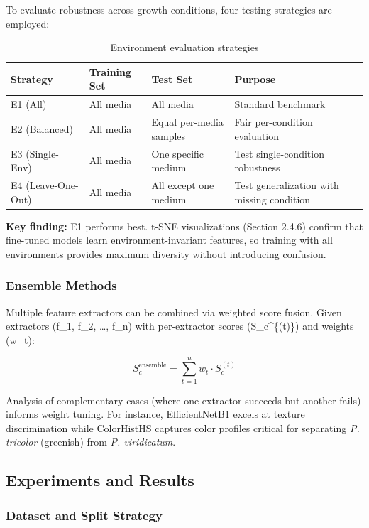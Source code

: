 To evaluate robustness across growth conditions, four testing strategies are employed:

\begin{table}[h]
\centering
\caption{Environment evaluation strategies}
\begin{tabular}{@{}llll@{}}
\toprule
\textbf{Strategy} & \textbf{Training Set} & \textbf{Test Set} & \textbf{Purpose} \\
\midrule
E1 (All) & All media & All media & Standard benchmark \\
E2 (Balanced) & All media & Equal per-media samples & Fair per-condition evaluation \\
E3 (Single-Env) & All media & One specific medium & Test single-condition robustness \\
E4 (Leave-One-Out) & All media & All except one medium & Test generalization with missing condition \\
\bottomrule
\end{tabular}
\end{table}

\textbf{Key finding:} E1 performs best. t-SNE visualizations (Section 2.4.6) confirm that fine-tuned models learn environment-invariant features, so training with all environments provides maximum diversity without introducing confusion.

\subsubsection{Ensemble Methods}\label{ensemble-methods}

Multiple feature extractors can be combined via weighted score fusion. Given extractors (f\_1, f\_2, \ldots, f\_n) with per-extractor scores (S\_c\^{}\{(t)\}) and weights (w\_t):

\[ S_c^{\text{ensemble}} = \sum_{t=1}^{n} w_t \cdot S_c^{(t)} \]

Analysis of complementary cases (where one extractor succeeds but another fails) informs weight tuning. For instance, EfficientNetB1 excels at texture discrimination while ColorHistHS captures color profiles critical for separating \textit{P. tricolor} (greenish) from \textit{P. viridicatum}.

\subsection{Experiments and Results}\label{experiments-and-results}

\subsubsection{Dataset and Split Strategy}\label{dataset-and-split-strategy}

